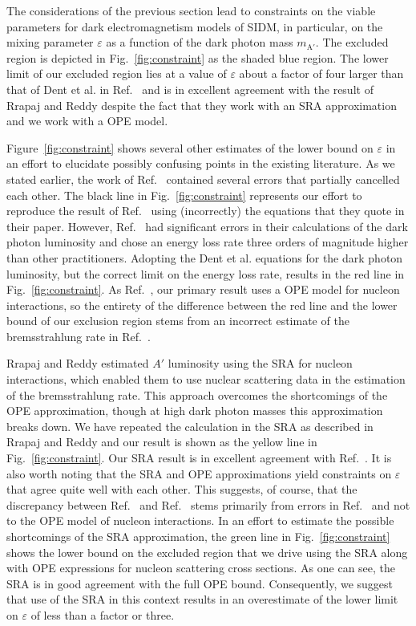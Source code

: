 \documentclass[nofootinbib,prd,superscriptaddress,twocolumn]{revtex4}
\begin{document}
The considerations of the previous section lead to constraints on the 
viable parameters for dark electromagnetism models of SIDM, in particular, 
on the mixing parameter $\varepsilon$ as a function of the dark photon mass $m_{\mathrm{A'}}$. 
The excluded region is depicted in Fig.~\ref{fig:constraint} as the shaded blue region. The 
lower limit of our excluded region lies at a value of $\varepsilon$ about a factor of four 
larger than that of Dent et al. in Ref.~\cite{dent_etal12} and is in excellent agreement 
with the result of Rrapaj and Reddy \cite{rrapaj_reddy16} despite the fact that they work 
with an SRA approximation and we work with a OPE model.

Figure~\ref{fig:constraint} shows several other estimates of the lower bound on 
$\varepsilon$ in an effort to elucidate possibly confusing points in the existing 
literature. As we stated earlier, the work of Ref.~\cite{dent_etal12} contained several 
errors that partially cancelled each other. The black line in Fig.~\ref{fig:constraint} represents 
our effort to reproduce the result of Ref.~\cite{dent_etal12} using (incorrectly) the equations 
that they quote in their paper. However, Ref.~\cite{dent_etal12} had significant errors in 
their calculations of the dark photon luminosity and chose an energy loss rate three orders 
of magnitude higher than other practitioners. Adopting the Dent et al. \cite{dent_etal12} 
equations for the dark photon luminosity, but the correct limit on the energy loss rate, 
results in the red line in Fig.~\ref{fig:constraint}. As Ref.~\cite{dent_etal12}, our primary 
result uses a OPE model for nucleon interactions, so the entirety of the difference between 
the red line and the lower bound of our exclusion region stems from an incorrect estimate 
of the bremsstrahlung rate in Ref.~\cite{dent_etal12}. 


Rrapaj and Reddy \cite{rrapaj_reddy16} estimated $A'$ luminosity 
using the SRA for nucleon interactions, which enabled them to use 
nuclear scattering data in the estimation of the bremsstrahlung rate. 
This approach overcomes the shortcomings of the OPE approximation, 
though at high dark photon masses this approximation breaks down. 
We have repeated the calculation in the SRA as described in 
Rrapaj and Reddy \cite{rrapaj_reddy16} and our result is 
shown as the yellow line in Fig.~\ref{fig:constraint}. 
Our SRA result is in excellent agreement with Ref.~\cite{rrapaj_reddy16}. It is 
also worth noting that the SRA and OPE approximations yield constraints 
on $\varepsilon$ that agree quite well with each other. This suggests, of course, 
that the discrepancy between Ref.~\cite{dent_etal12} and Ref.~\cite{rrapaj_reddy16} 
stems primarily from errors in Ref.~\cite{dent_etal12} and not to the OPE model 
of nucleon interactions. In an effort to estimate 
the possible shortcomings of the SRA approximation, the green line in 
Fig.~\ref{fig:constraint} shows the lower bound on the excluded region that 
we drive using the SRA along with OPE expressions for nucleon scattering 
cross sections. As one can see, the SRA is in good agreement with the full 
OPE bound. Consequently, we suggest that use of the SRA in this context 
results in an overestimate of the lower limit on $\varepsilon$ of less than 
a factor or three. 
\end{document}
